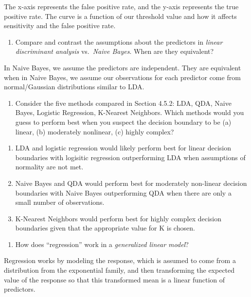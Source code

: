 \documentclass[
]{article}
\providecommand{\tightlist}{%
  \setlength{\itemsep}{0pt}\setlength{\parskip}{0pt}}
\begin{document}
The x-axis represents the false positive rate, and the y-axis represents
the true positive rate. The curve is a function of our threshold value
and how it affects sensitivity and the false positive rate.

\begin{enumerate}
\def\labelenumi{\arabic{enumi}.}
\setcounter{enumi}{7}
\tightlist
\item
  Compare and contrast the assumptions about the predictors in
  \emph{linear discriminant analysis} vs.~\emph{Naive Bayes}. When are
  they equivalent?
\end{enumerate}

In Naive Bayes, we assume the predictors are independent. They are
equivalent when in Naive Bayes, we assume our observations for each
predictor come from normal/Gaussian distributions similar to LDA.

\begin{enumerate}
\def\labelenumi{\arabic{enumi}.}
\setcounter{enumi}{8}
\tightlist
\item
  Consider the five methods compared in Section 4.5.2: LDA, QDA, Naive
  Bayes, Logistic Regression, K-Nearest Neighbors. Which methods would
  you guess to perform best when you suspect the decision boundary to be
  (a) linear, (b) moderately nonlinear, (c) highly complex?
\end{enumerate}

\begin{enumerate}
\def\labelenumi{(\alph{enumi})}
\item
  LDA and logistic regression would likely perform best for linear
  decision boundaries with logisitic regression outperforming LDA when
  assumptions of normality are not met.
\item
  Naive Bayes and QDA would perform best for moderately non-linear
  decision boundaries with Naive Bayes outperforming QDA when there are
  only a small number of observations.
\item
  K-Nearest Neighbors would perform best for highly complex decision
  boundaries given that the appropriate value for K is chosen.
\end{enumerate}

\begin{enumerate}
\def\labelenumi{\arabic{enumi}.}
\setcounter{enumi}{9}
\tightlist
\item
  How does ``regression'' work in a \emph{generalized linear model}?
\end{enumerate}

Regression works by modeling the response, which is assumed to come from
a distribution from the exponential family, and then transforming the
expected value of the response so that this transformed mean is a linear
function of predictors.
\end{document}
